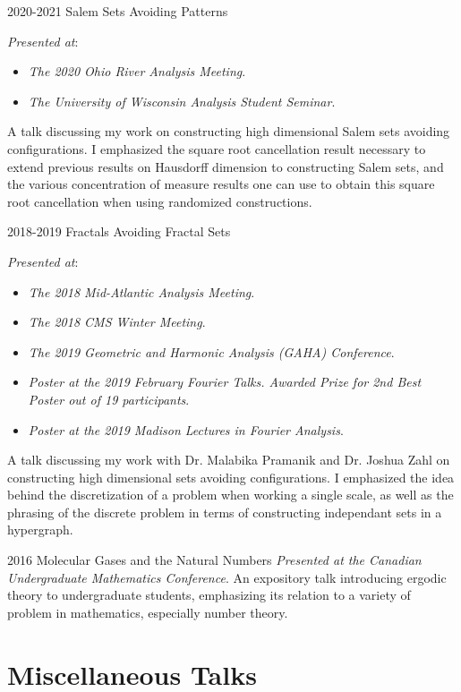 \documentclass[a4paper]{cv-friggeri}
\begin{document}
\begin{entrylist}

\entry
{2020-2021}
{Salem Sets Avoiding Patterns}
{}
{\emph{Presented at}:
%
\begin{itemize}
	\item \emph{The 2020 Ohio River Analysis Meeting}.
	\item \emph{The University of Wisconsin Analysis Student Seminar}.
\end{itemize}
%
A talk discussing my work on constructing high dimensional Salem sets avoiding configurations. I emphasized the square root cancellation result necessary to extend previous results on Hausdorff dimension to constructing Salem sets, and the various concentration of measure results one can use to obtain this square root cancellation when using randomized constructions.}

\entry
{2018-2019}
{Fractals Avoiding Fractal Sets}
{}
{\emph{Presented at}:
%
\begin{itemize}
	\item \emph{The 2018 Mid-Atlantic Analysis Meeting}.
	\item \emph{The 2018 CMS Winter Meeting}.
	\item \emph{The 2019 Geometric and Harmonic Analysis (GAHA) Conference}.
	\item \emph{Poster at the 2019 February Fourier Talks. Awarded Prize for 2nd Best Poster out of 19 participants}.
	\item \emph{Poster at the 2019 Madison Lectures in Fourier Analysis}.
\end{itemize}
%
A talk discussing my work with Dr. Malabika Pramanik and Dr. Joshua Zahl on constructing high dimensional sets avoiding configurations. I emphasized the idea behind the discretization of a problem when working a single scale, as well as the phrasing of the discrete problem in terms of constructing independant sets in a hypergraph.}

\entry
{2016}
{Molecular Gases and the Natural Numbers}
{}
{\emph{Presented at the Canadian Undergraduate Mathematics Conference}. An expository talk introducing ergodic theory to undergraduate students, emphasizing its relation to a variety of problem in mathematics, especially number theory.}

\end{entrylist}

\section{Miscellaneous Talks}
\end{document}
